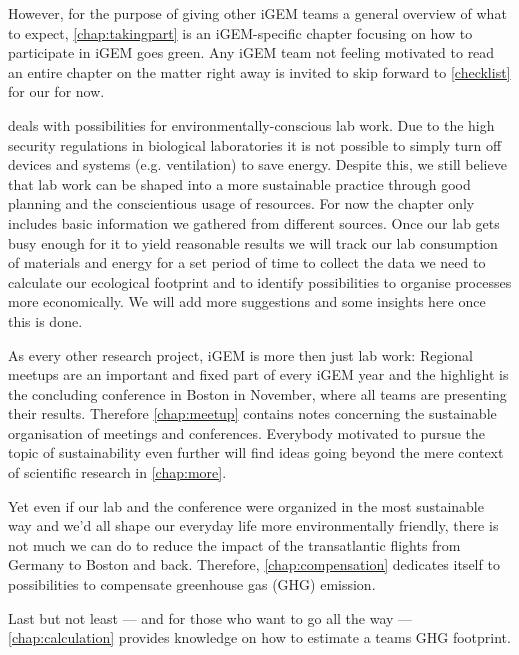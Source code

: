 However, for the purpose of giving other iGEM teams a general overview of what to expect, \cref{chap:takingpart} is an iGEM-specific chapter focusing on how to participate in iGEM goes green. Any iGEM team not feeling motivated to read an entire chapter on the matter right away is invited to skip forward to \cref{checklist} for our  for now.

 deals with possibilities for environmentally-conscious lab work. Due to the high security regulations in biological laboratories it is not possible to simply turn off devices and systems (e.g. ventilation) to save energy. Despite this, we still believe that lab work can be shaped into a more sustainable practice through good planning and the conscientious usage of resources. For now the chapter only includes basic information we gathered from different sources. Once our lab gets busy enough for it to yield reasonable results we will track our lab consumption of materials and energy for a set period of time to collect the data we need to calculate our ecological footprint and to identify possibilities to organise processes more economically. We will add more suggestions and some insights here once this is done.

As every other research project, iGEM is more then just lab work: Regional meetups are an important and fixed part of every iGEM year and the highlight is the concluding conference in Boston in November, where all teams are presenting their results. Therefore \cref{chap:meetup} contains notes concerning the sustainable organisation of meetings and conferences. Everybody motivated to pursue the topic of sustainability even further will find ideas going beyond the mere context of scientific research in \cref{chap:more}.

Yet even if our lab and the conference were organized in the most sustainable way and we'd all shape our everyday life more environmentally friendly, there is not much we can do to reduce the impact of the transatlantic flights from Germany to Boston and back. Therefore, \cref{chap:compensation} dedicates itself to possibilities to compensate greenhouse gas (GHG) emission.

Last but not least --- and for those who want to go all the way --- \cref{chap:calculation} provides knowledge on how to estimate a teams GHG footprint.
